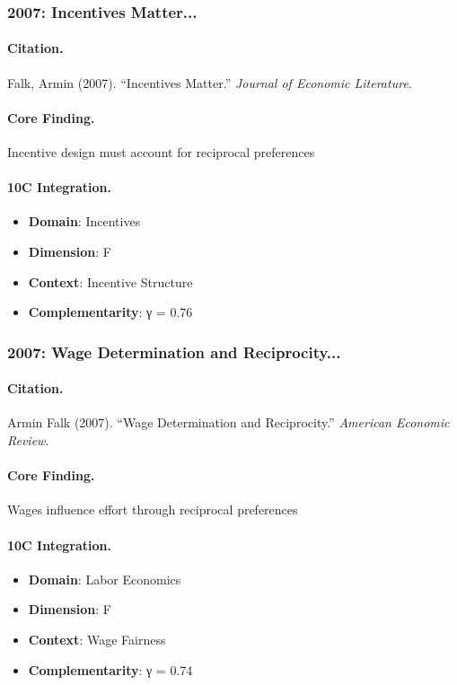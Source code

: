 \subsubsection{2007: Incentives Matter...}

\paragraph{Citation.}
Falk, Armin (2007). ``Incentives Matter.''
\textit{Journal of Economic Literature}.

\paragraph{Core Finding.}
Incentive design must account for reciprocal preferences

\paragraph{10C Integration.}
\begin{itemize}[nosep]
  \item \textbf{Domain}: Incentives
  \item \textbf{Dimension}: F
  \item \textbf{Context}: Incentive Structure
  \item \textbf{Complementarity}: γ = 0.76
\end{itemize}


\subsubsection{2007: Wage Determination and Reciprocity...}

\paragraph{Citation.}
Armin Falk (2007). ``Wage Determination and Reciprocity.''
\textit{American Economic Review}.

\paragraph{Core Finding.}
Wages influence effort through reciprocal preferences

\paragraph{10C Integration.}
\begin{itemize}[nosep]
  \item \textbf{Domain}: Labor Economics
  \item \textbf{Dimension}: F
  \item \textbf{Context}: Wage Fairness
  \item \textbf{Complementarity}: γ = 0.74
\end{itemize}


